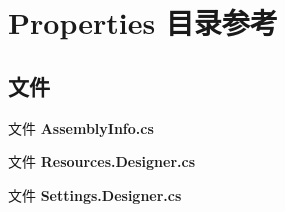 \section{Properties 目录参考}
\label{dir_d051c76eebdc544d9c3d734575641c72}
\subsection*{文件}
\begin{DoxyCompactItemize}
\item 
文件 \textbf{ Assembly\+Info.\+cs}
\item 
文件 \textbf{ Resources.\+Designer.\+cs}
\item 
文件 \textbf{ Settings.\+Designer.\+cs}
\end{DoxyCompactItemize}
